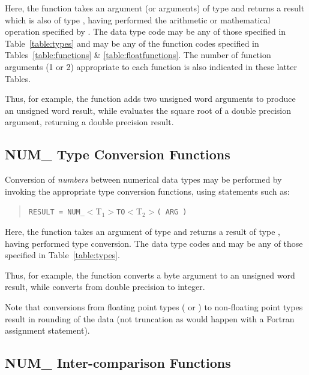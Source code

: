 Here, the  function takes an argument (or arguments) of type
 and returns a result which is also of type ,
having performed the arithmetic or mathematical operation specified by
.
The data type code  may be any of those specified in
Table~\ref{table:types} and  may be any of the function
codes specified in Tables~\ref{table:functions} \&
\ref{table:floatfunctions}.
The number of function arguments (1 or 2) appropriate to each function is
also indicated in these latter Tables.

Thus, for example, the function  adds two unsigned word
arguments to produce an unsigned word result, while 
evaluates the square root of a double precision argument, returning a double
precision result.

\subsection{NUM\_ Type Conversion Functions}

Conversion of {\em numbers} between numerical data types may be performed by
invoking the appropriate  type conversion functions, using
statements such as:

\begin{quote}
\verb#RESULT = NUM_#$<$T$_{1}>$\verb#TO#$<$T$_{2}>$\verb#( ARG )#
\end{quote}

Here, the  function takes an argument of type 
and returns a result of type , having performed type
conversion.
The data type codes  and  may be any of
those specified in Table~\ref{table:types}.

Thus, for example, the function  converts a byte argument
to an unsigned word result, while  converts from double
precision to integer.

Note that conversions from floating point types ( or
) to non-floating point types result in rounding of the data
(not truncation as would happen with a Fortran assignment statement).

\subsection{NUM\_ Inter-comparison Functions}
\label{section:logicals}

